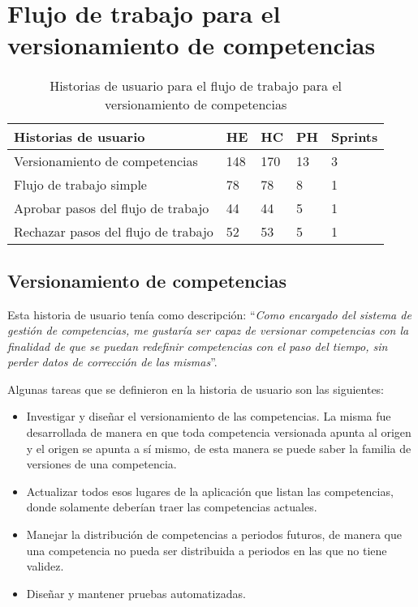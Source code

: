 \section{Flujo de trabajo para el versionamiento de competencias}

\begin{table}[H]
\centering
\begin{tabular}{@{}lllll@{}}
\toprule
Historias de usuario                & HE  & HC  & PH & Sprints \\ \midrule
Versionamiento de competencias      & 148 & 170 & 13 & 3       \\
Flujo de trabajo simple             & 78  & 78  & 8  & 1       \\
Aprobar pasos del flujo de trabajo  & 44  & 44  & 5  & 1       \\
Rechazar pasos del flujo de trabajo & 52  & 53  & 5  & 1       \\ \bottomrule
\end{tabular}
\caption{Historias de usuario para el flujo de trabajo para el versionamiento de competencias}
\label{epic:3}
\end{table}

\subsection{Versionamiento de competencias}
Esta historia de usuario tenía como descripción: \enquote{\textit{Como encargado del sistema de gestión de competencias, me gustaría ser capaz de versionar competencias con la finalidad de que se puedan redefinir competencias con el paso del tiempo, sin perder datos de corrección de las mismas}}.

Algunas tareas que se definieron en la historia de usuario son las siguientes:
\begin{itemize}
	\item Investigar y diseñar el versionamiento de las competencias. La misma fue desarrollada de manera en que toda competencia versionada apunta al origen y el origen se apunta a sí mismo, de esta manera se puede saber la familia de versiones de una competencia.
	\item Actualizar todos esos lugares de la aplicación que listan las competencias, donde solamente deberían traer las competencias actuales.
	\item Manejar la distribución de competencias a periodos futuros, de manera que una competencia no pueda ser distribuida a periodos en las que no tiene validez.
	\item Diseñar y mantener pruebas automatizadas.
\end{itemize}

